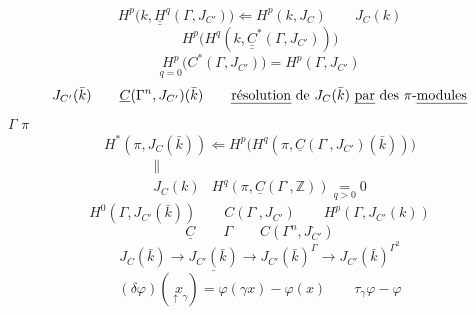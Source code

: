 \documentclass[11pt,a4paper]{article}
\begin{document}
\[
H^{p}\bigl(k, \underline{\underline{H}}^{q}(\Gamma, J_{C'})\bigr) \Longleftarrow H^{p}(k, J_C) \qquad J_C(k)
\]
\[
H^{p}\bigl(H^{q}(k, \underline{\underline{C}}^{*}(\Gamma, J_{C'}))\bigr)
\]
\[
\underset{q = 0}{H^{p}}\bigl(C^{*}(\Gamma, J_{C'})\bigr) = H^{p}(\Gamma, J_{C'})
\]
\[
J_{C'}(\bar k) \qquad \underline{C}(\Gamma^{n}, J_{C'})(\bar k) \qquad \text{\emph{résolution} de } J_C(\bar k) \text{ \uncertain{par} des } \pi\text{-\uncertain{modules}}
\]
$\Gamma$ \quad $\pi$
\[
H^{*}(\pi, J_C(\bar k)) \Longleftarrow H^{p}\bigl(H^{q}(\pi, \underline{C}(\Gamma^{\cdot}, J_{C'})(\bar k))\bigr)
\]
\[
\begin{array}{ll}
\| & \\
J_C(k) & H^{q}(\pi, \underline{C}(\Gamma^{\cdot}, \mathbb{Z})) \underset{q > 0}{=} 0
\end{array}
\]
\[
H^0(\Gamma, J_{C'}(\bar k)) \qquad C(\Gamma^{\cdot}, J_{C'}) \qquad H^{p}(\Gamma, J_{C'}(k))
\]
\[
\underline{C} \qquad \Gamma \qquad C(\Gamma^{n}, J^{\cdot}_{C'})
\]
\[
J_C(\bar k) \to \underline{J_{C'}(\bar k)} \longrightarrow J_{C'}(\bar k)^{\Gamma} \longrightarrow J_{C'}(\bar k)^{\Gamma^{2}}
\]
\[
(\delta\varphi)(\underset{\uparrow\,\gamma}{x}) = \varphi(\gamma x) - \varphi(x) \qquad \tau_\gamma \varphi - \varphi
\]
\end{document}
